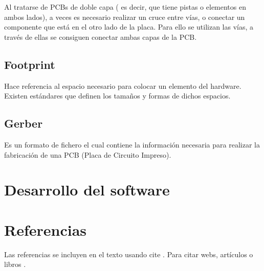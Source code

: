Al tratarse de PCBs de doble capa ( es decir, que tiene pistas o elementos en ambos lados), a veces es necesario realizar un cruce entre vías, o conectar un componente que está en el otro lado de la placa. Para ello se utilizan las vías, a través de ellas se consiguen conectar ambas capas de la PCB.


\subsection{Footprint}\label{footprint}

Hace referencia al espacio necesario para colocar un elemento del hardware. Existen estándares que definen los tamaños y formas de dichos espacios.


\subsection{Gerber}\label{gerber}
Es un formato de fichero el cual contiene la información necesaria para realizar la fabricación de una PCB (Placa de Circuito Impreso).

\section{Desarrollo del software}\label{desarrollo_del_software}




\section{Referencias}

Las referencias se incluyen en el texto usando cite \cite{wiki:latex}. Para citar webs, artículos o libros \cite{koza92}.



